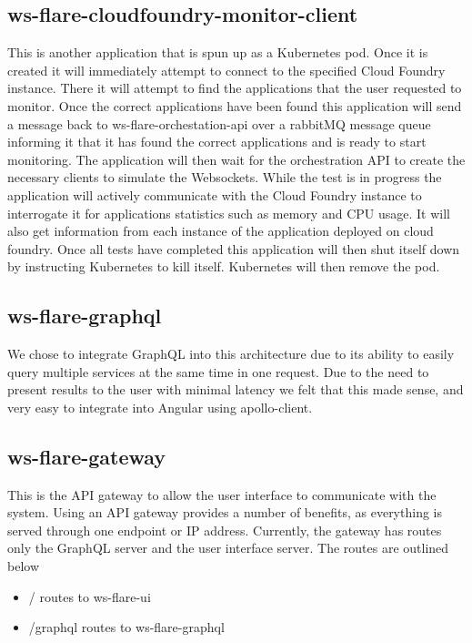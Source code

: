 \subsection{ws-flare-cloudfoundry-monitor-client}

This is another application that is spun up as a Kubernetes pod. Once it is created it will immediately attempt to connect to the specified Cloud Foundry instance. There it will attempt to find the applications that the user requested to monitor. Once the correct applications have been found this application will send a message back to ws-flare-orchestation-api over a rabbitMQ message queue informing it that it has found the correct applications and is ready to start monitoring. The application will then wait for the orchestration API to create the necessary clients to simulate the Websockets. While the test is in progress the application will actively communicate with the Cloud Foundry instance to interrogate it for applications statistics such as memory and CPU usage. It will also get information from each instance of the application deployed on cloud foundry. Once all tests have completed this application will then shut itself down by instructing Kubernetes to kill itself. Kubernetes will then remove the pod.

\subsection{ws-flare-graphql}

We chose to integrate GraphQL into this architecture due to its ability to easily query multiple services at the same time in one request. Due to the need to present results to the user with minimal latency we felt that this made sense, and very easy to integrate into Angular using apollo-client.

\subsection{ws-flare-gateway}

This is the API gateway to allow the user interface to communicate with the system. Using an API gateway provides a number of benefits, as everything is served through one endpoint or IP address. Currently, the gateway has routes only the GraphQL server and the user interface server. The routes are outlined below

\begin{itemize}
  \item / routes to ws-flare-ui
  \item /graphql routes to ws-flare-graphql
\end{itemize}

